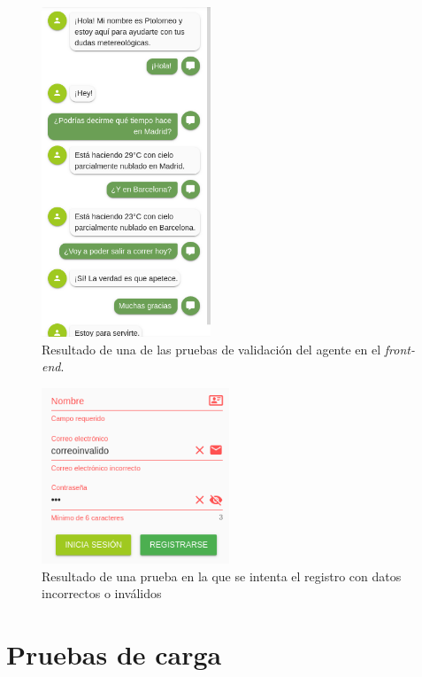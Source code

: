 \documentclass[11pt,spanish,listoffigures]{tfgetsinf}
\begin{document}
\begin{figure}[h!]
    \centering
    \includegraphics[width=0.45\textwidth]{images/img21.png}
    \caption{Resultado de una de las pruebas de validación del agente en el \textit{front-end}.}
    \label{fig:test2}
\end{figure}

\begin{figure}[h!]
    \centering
    \includegraphics[width=0.5\textwidth]{images/img22.png}
    \caption{Resultado de una prueba en la que se intenta el registro con datos incorrectos o inválidos}
    \label{fig:test3}
\end{figure}


\section{Pruebas de carga}
\label{sec:pruebas de carga}
\end{document}
